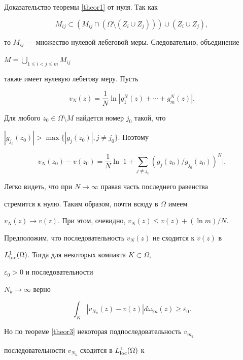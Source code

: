 \begin{pf*}{Доказательство теоремы \ref{theor1}}
от нуля. Так как


$$


M_{ij}\subset 


\left(M_{ij}\cap\left(\Omega\setminus(Z_i\cup Z_j)\right)


\right)\cup(Z_i\cup Z_j),


$$


то $M_{ij}$ --- множество нулевой лебеговой меры. Следовательно, объединение


$M=\bigcup\limits_{1\le i<j\le m}M_{ij}$


также имеет нулевую лебегову меру. Пусть 


$$


v_N(z)=\frac1N\ln\left|g_1^N(z)+\dotsb+g_m^N(z)\right|.


$$


Для любого $z_0\in \Omega\setminus M$ найдется номер $j_0$ такой, что 


$|g_{j_0}(z_0)|>\max\{|g_j(z_0)|, j\ne j_0\}$. Поэтому


$$


v_N(z_0)-v(z_0)=\frac1N\ln\bigg|1+\sum\limits_{j\ne j_0}


\left(g_j(z_0)/g_{j_0}(z_0)\right)^N\bigg|.


$$


Легко видеть, что при $N\to\infty$ правая часть последнего равенства 


стремится к нулю. Таким образом, почти всюду в $\Omega$ имеем


$v_N(z)\to v(z)$. При этом, очевидно, $v_N(z)\le v(z)+(\ln m)/N$.


Предположим, что последовательность $v_N(z)$ не сходится к $v(z)$ в 


$L^1_{\operatorname{loc}}(\Omega)$. Тогда для некоторых компакта $K\subset\Omega$, 


$\varepsilon_0>0$ и последовательности


$N_k\to\infty$ верно 


\begin{equation}\label{form9}


\int_K\left|v_{N_k}(z)-v(z)\right|d\omega_{2n}(z)\ge\varepsilon_0.


\end{equation}





Но по теореме \ref{theor3} некоторая подпоследовательность $v_{m_q}$ 


последовательности $v_{N_k}$ сходится в $L^1_{\operatorname{loc}}(\Omega)$ к 



\end{pf*}
